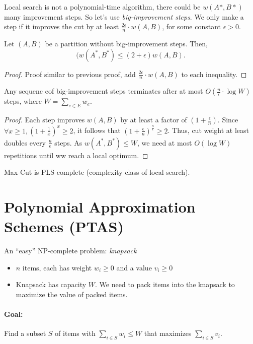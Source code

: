 Local search is not a polynomial-time algorithm, there could be $w(A*,B*)$ many improvement steps. So let's use \emph{big-improvement steps}. We only make a step if it improves the cut by at least $\frac{2\epsilon}{n}\cdot w(A,B)$, for some constant $\epsilon>0$.

\begin{theorem}
	Let $(A,B)$ be a partition without big-improvement steps. Then,
	 $$(w(A^*, B^*) \le (2 + \epsilon) w(A,B).$$
\end{theorem}
\begin{proof}
	Proof similar to previous proof, add $\frac{2 \epsilon}{n} \cdot w(A,B)$ to each inequality.
\end{proof}

\begin{theorem}
	Any sequenc eof big-improvement steps terminates after at most $O(\frac{n}{\epsilon} \cdot \log W)$ steps, where $W = \sum\limits_{e \in E}w_e$.
\end{theorem}
\begin{proof}
	Each step improves $w(A,B)$ by at least a factor of $\left (1 + \frac{\epsilon}{n}\right )$. Since $\forall x \ge 1, \left ( 1 + \frac{1}{x} \right )^x \ge 2$, it follows that $\left ( 1 + \frac{\epsilon}{n}\right)^{\frac{n}{\epsilon}} \ge 2$. Thus, cut weight at least doubles every $\frac{n}{\epsilon}$ steps. As $w(A^*,B^*)\le W$, we need at most $O(\log W)$ repetitions until ww reach a local optimum.
\end{proof}

Max-Cut is PLS-complete (complexity class of local-search).

\section{Polynomial Approximation Schemes (PTAS)}

An ``easy'' NP-complete problem: \emph{knapsack}

\begin{itemize}
	\item $n$ items, each has weight $w_i \ge 0$ and a value $v_i \ge 0$
	\item Knapsack has capacity $W$. We need to pack items into the knapsack to maximize the value of packed items.
\end{itemize}

\paragraph{Goal:} Find a subset $S$ of items with $\sum\limits_{i \in S} w_i \le W$ that maximizes $\sum\limits_{i \in S} v_i$.

